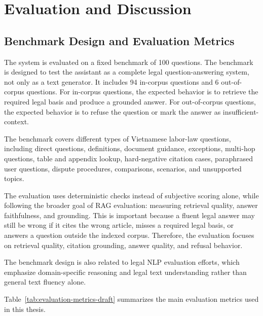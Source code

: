 \section{Evaluation and Discussion}

\subsection{Benchmark Design and Evaluation Metrics}

The system is evaluated on a fixed benchmark of 100 questions. The benchmark is designed to test the assistant as a complete legal question-answering system, not only as a text generator. It includes 94 in-corpus questions and 6 out-of-corpus questions. For in-corpus questions, the expected behavior is to retrieve the required legal basis and produce a grounded answer. For out-of-corpus questions, the expected behavior is to refuse the question or mark the answer as insufficient-context.

The benchmark covers different types of Vietnamese labor-law questions, including direct questions, definitions, document guidance, exceptions, multi-hop questions, table and appendix lookup, hard-negative citation cases, paraphrased user questions, dispute procedures, comparisons, scenarios, and unsupported topics.

The evaluation uses deterministic checks instead of subjective scoring alone, while following the broader goal of RAG evaluation: measuring retrieval quality, answer faithfulness, and grounding. This is important because a fluent legal answer may still be wrong if it cites the wrong article, misses a required legal basis, or answers a question outside the indexed corpus. Therefore, the evaluation focuses on retrieval quality, citation grounding, answer quality, and refusal behavior.

The benchmark design is also related to legal NLP evaluation efforts, which emphasize domain-specific reasoning and legal text understanding rather than general text fluency alone.

Table~\ref{tab:evaluation-metrics-draft} summarizes the main evaluation metrics used in this thesis.

